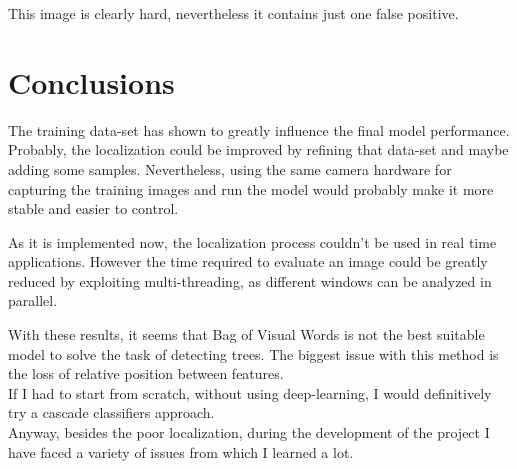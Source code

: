 \documentclass[]{report}
\begin{document}
This image is clearly hard, nevertheless it contains just one false positive.

\section{Conclusions}
The training data-set has shown to greatly influence the final model performance. Probably, the localization could be improved by refining that data-set and maybe adding some samples. Nevertheless, using the same camera hardware for capturing the training images and run the model would probably make it more stable and easier to control.

As it is implemented now, the localization process couldn't be used in real time applications. However the time required to evaluate an image could be greatly reduced by exploiting multi-threading, as different windows can be analyzed in parallel.

With these results, it seems that Bag of Visual Words is not the best suitable model to solve the task of detecting trees. The biggest issue with this method is the loss of relative position between features.\\
If I had to start from scratch, without using deep-learning, I would definitively try a cascade classifiers approach. \\
Anyway, besides the poor localization, during the development of the project I have faced a variety of issues from which I learned a lot.
\end{document}
